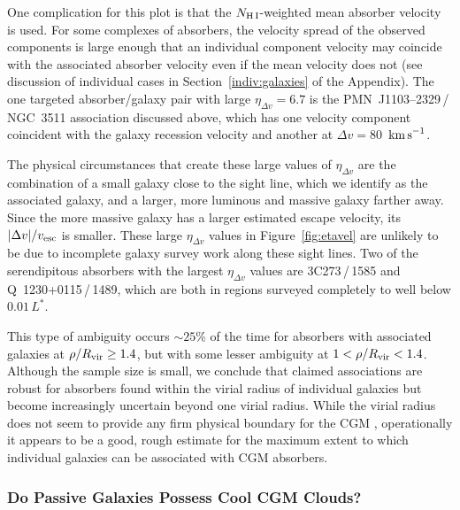 \documentclass[twocolumn,twocolappendix,tighten,times]{aastex6}
\newcommand{\kms}{\ensuremath{{\rm km\,s}^{-1}}}
\begin{document}
\clearpage



One complication for this plot is that the $N_{\rm H\,I}$-weighted mean absorber 
velocity is used. For some complexes of absorbers, the velocity spread of the 
observed components is large enough that an individual component velocity may 
coincide with the associated absorber velocity even if the mean velocity does not
(see discussion of individual cases in Section~\ref{indiv:galaxies} of the
Appendix). The one targeted absorber/galaxy pair with large 
$\eta_{\Delta v} = 6.7$ is the PMN~J1103--2329\,/\,NGC~3511 association discussed
above, which has one velocity component coincident with the galaxy recession 
velocity and another at $\Delta v = 80$~\kms.

The physical circumstances that create these large values of $\eta_{\Delta v}$ are 
the combination of a small galaxy close to the sight line, which we identify as the 
associated galaxy, and a larger, more luminous and massive galaxy farther away. 
Since the more massive galaxy has a larger estimated escape velocity, its 
$|\Delta v|/v_{\rm esc}$  is smaller. These large $\eta_{\Delta v}$ values in 
Figure~\ref{fig:etavel} are unlikely to be due to incomplete galaxy survey work 
along these sight lines. Two of the serendipitous absorbers with the largest 
$\eta_{\Delta v}$ values are 3C273\,/\,1585 and Q~1230+0115\,/\,1489, which are 
both in regions surveyed completely to well below $0.01\,L^*$. 

This type of ambiguity occurs $\sim25$\% of the time for absorbers with associated 
galaxies at $\rho/R_{\rm vir} \geq 1.4$, but with some lesser ambiguity at 
$1 < \rho/R_{\rm vir} < 1.4$. Although the sample size is small, we conclude that 
claimed associations are robust for absorbers found within the virial radius of 
individual galaxies but become increasingly uncertain beyond one virial radius. 
While the virial radius does not seem to provide any firm physical boundary for the 
CGM \citep[][and see Section 3.1 in Paper~1]{shull14}, operationally it appears to 
be a good, rough estimate for the maximum extent to which individual galaxies can 
be associated with CGM absorbers.


\subsubsection{Do Passive Galaxies Possess Cool CGM Clouds?}
\label{discussion:association:passive}
\end{document}
